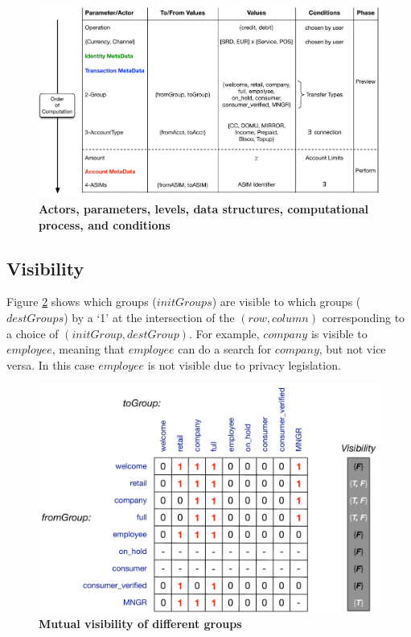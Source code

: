 \begin{figure}[htbp]
\centering
\includegraphics[width=17cm]{Figures/Vocabulary}
\caption{\small\textbf{Actors, parameters, levels, data structures, computational process, and conditions}}
\label{fig:vocabulary}
\end{figure}

\subsection{Visibility}
Figure \ref{fig:visibility} shows which groups ($initGroups$) are visible to which groups ($destGroups$) by a `1' at the intersection of the $(row, column)$ corresponding to a choice of $(initGroup, destGroup)$. For example, $company$ is visible to $employee$, meaning that $employee$ can do a search for $company$, but not vice versa. In this case $employee$ is not visible due to privacy legislation.

\begin{figure}[H]
\centering
\includegraphics[width=12cm]{Figures/Visibility}
\caption{\small\textbf{Mutual visibility of different groups}}
\label{fig:visibility}
\vspace{-0.5cm}
\end{figure}

